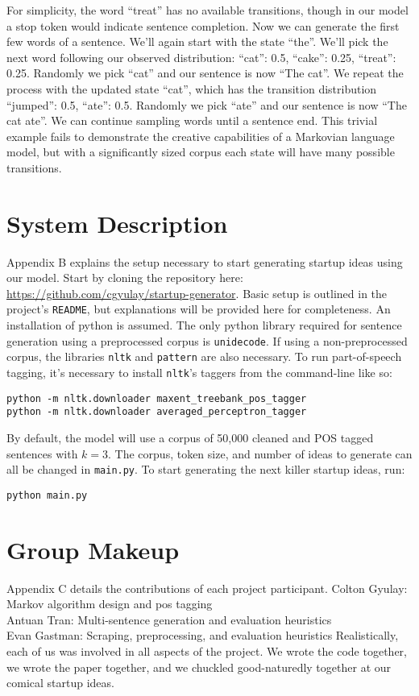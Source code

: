 \documentclass[11pt]{article}
\begin{document}
For simplicity, the word ``treat'' has no available transitions, though in our model a stop token would indicate sentence completion. Now we can generate the first few words of a sentence. We'll again start with the state ``the''. We'll pick the next word following our observed distribution: ``cat'': 0.5, ``cake'': 0.25, ``treat'': 0.25. Randomly we pick ``cat'' and our sentence is now ``The cat''. We repeat the process with the updated state ``cat'', which has the transition distribution ``jumped'': 0.5, ``ate'': 0.5. Randomly we pick ``ate'' and our sentence is now ``The cat ate''. We can continue sampling words until a sentence end. This trivial example fails to demonstrate the creative capabilities of a Markovian language model, but with a significantly sized corpus each state will have many possible transitions.

\section{System Description}

Appendix B explains the setup necessary to start generating startup ideas using our model. Start by cloning the repository here: \url{https://github.com/cgyulay/startup-generator}. Basic setup is outlined in the project's \texttt{README}, but explanations will be provided here for completeness. An installation of python is assumed. The only python library required for sentence generation using a preprocessed corpus is \texttt{unidecode}. If using a non-preprocessed corpus, the libraries \texttt{nltk} and \texttt{pattern} are also necessary. To run part-of-speech tagging, it's necessary to install \texttt{nltk}'s taggers from the command-line like so:
\begin{lstlisting}
python -m nltk.downloader maxent_treebank_pos_tagger
python -m nltk.downloader averaged_perceptron_tagger
\end{lstlisting}
By default, the model will use a corpus of 50,000 cleaned and POS tagged sentences with \(k=3\). The corpus, token size, and number of ideas to generate can all be changed in \texttt{main.py}. To start generating the next killer startup ideas, run:
\begin{lstlisting}
python main.py
\end{lstlisting}

\section{Group Makeup}
Appendix C details the contributions of each project participant.\newline\newline
Colton Gyulay: Markov algorithm design and pos tagging\\
Antuan Tran: Multi-sentence generation and evaluation heuristics\\
Evan Gastman: Scraping, preprocessing, and evaluation heuristics\newline\newline
Realistically, each of us was involved in all aspects of the project. We wrote the code together, we wrote the paper together, and we chuckled good-naturedly together at our comical startup ideas.

 

\end{document}
